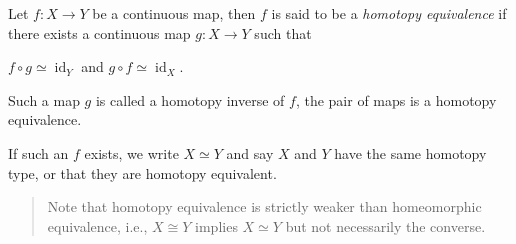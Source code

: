 
\begin{definition}

Let \(f: X \to Y\) be a continuous map, then \(f\) is said to be a
\emph{homotopy equivalence} if there exists a continuous map
\(g: X \to Y\) such that

\(f\circ g \simeq\operatorname{id}_Y\) and
\(g\circ f \simeq\operatorname{id}_X\).

Such a map \(g\) is called a homotopy inverse of \(f\), the pair of maps
is a homotopy equivalence.

If such an \(f\) exists, we write \(X \simeq Y\) and say \(X\) and \(Y\)
have the same homotopy type, or that they are homotopy equivalent.

\begin{quote}
Note that homotopy equivalence is strictly weaker than homeomorphic
equivalence, i.e., \(X\cong Y\) implies \(X \simeq Y\) but not
necessarily the converse.
\end{quote}

\end{definition}

\begin{definition}

\end{definition}


\begin{definition}

\end{definition}


\begin{definition}

\end{definition}


